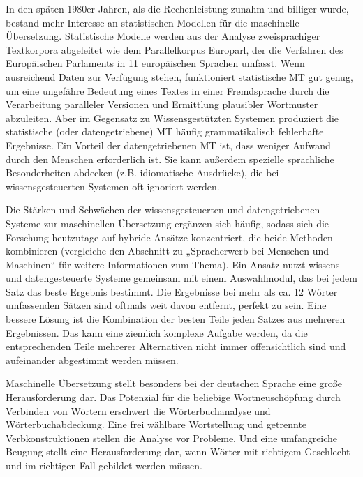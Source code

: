 \documentclass[]{../../metanetpaper}
\begin{document}
\begin{Parallel}[c]{80mm}{80mm}
{In den späten 1980er-Jahren, als die Rechenleistung zunahm und billiger wurde, bestand mehr Interesse an statistischen Modellen für die maschinelle Übersetzung. Statistische Modelle werden aus der Analyse zweisprachiger Textkorpora abgeleitet wie dem Parallelkorpus Europarl, der die Verfahren des Europäischen Parlaments in 11 europäischen Sprachen umfasst. Wenn ausreichend Daten zur Verfügung stehen, funktioniert statistische MT gut genug, um eine ungefähre Bedeutung eines Textes in einer Fremdsprache durch die Verarbeitung paralleler Versionen und Ermittlung plausibler Wortmuster abzuleiten. Aber im Gegensatz zu Wissensgestützten Systemen produziert die statistische (oder datengetriebene) MT häufig grammatikalisch fehlerhafte Ergebnisse. Ein Vorteil der datengetriebenen MT ist, dass weniger Aufwand durch den Menschen erforderlich ist. Sie kann außerdem spezielle sprachliche Besonderheiten abdecken (z.B. idiomatische Ausdrücke), die bei wissensgesteuerten Systemen oft ignoriert werden. 

Die Stärken und Schwächen der wissensgesteuerten und datengetriebenen Systeme zur maschinellen Übersetzung ergänzen sich häufig, sodass sich die Forschung heutzutage auf hybride Ansätze konzentriert, die beide Methoden kombinieren (vergleiche den Abschnitt zu „Spracherwerb bei Menschen und Maschinen“ für weitere Informationen zum Thema). Ein Ansatz nutzt wissens- und datengesteuerte Systeme gemeinsam mit einem Auswahlmodul, das bei jedem Satz das beste Ergebnis bestimmt. Die Ergebnisse bei mehr als ca. 12 Wörter umfassenden Sätzen sind oftmals weit davon entfernt, perfekt zu sein. Eine bessere Lösung ist die Kombination der besten Teile jeden Satzes aus mehreren Ergebnissen. Das kann eine ziemlich komplexe Aufgabe werden, da die entsprechenden Teile mehrerer Alternativen nicht immer offensichtlich sind und aufeinander abgestimmt werden müssen. 

Maschinelle Übersetzung stellt besonders bei der deutschen Sprache eine große Herausforderung dar. Das Potenzial für die beliebige Wortneuschöpfung durch Verbinden von Wörtern erschwert die Wörterbuchanalyse und Wörterbuchabdeckung. Eine frei wählbare Wortstellung und getrennte Verbkonstruktionen stellen die Analyse vor Probleme. Und eine umfangreiche Beugung stellt eine Herausforderung dar, wenn Wörter mit richtigem Geschlecht und im richtigen Fall gebildet werden müssen. 

}
\end{Parallel}
\end{document}
